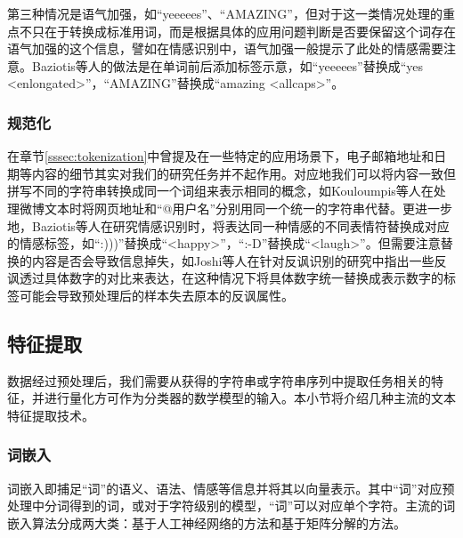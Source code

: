 第三种情况是语气加强，如“yeeeees”、“AMAZING”，但对于这一类情况处理的重点不只在于转换成标准用词，而是根据具体的应用问题判断是否要保留这个词存在语气加强的这个信息，譬如在情感识别中，语气加强一般提示了此处的情感需要注意。Baziotis等人\cite{baziotis2017semeval2}的做法是在单词前后添加标签示意，如“yeeeees”替换成“yes <enlongated>”，“AMAZING”替换成“amazing <allcaps>”。

\subsubsection{规范化}

在章节\ref{sssec:tokenization}中曾提及在一些特定的应用场景下，电子邮箱地址和日期等内容的细节其实对我们的研究任务并不起作用。对应地我们可以将内容一致但拼写不同的字符串转换成同一个词组来表示相同的概念，如Kouloumpis等人\cite{kouloumpis2011twitter}在处理微博文本时将网页地址和“@用户名”分别用同一个统一的字符串代替。更进一步地，Baziotis等人\cite{baziotis2017semeval2}在研究情感识别时，将表达同一种情感的不同表情符替换成对应的情感标签，如“:)))”替换成“<happy>”，“:-D”替换成“<laugh>”。但需要注意替换的内容是否会导致信息掉失，如Joshi等人\cite{joshi2015harnessing}在针对反讽识别的研究中指出一些反讽透过具体数字的对比来表达，在这种情况下将具体数字统一替换成表示数字的标签可能会导致预处理后的样本失去原本的反讽属性。

\subsection{特征提取}
\label{ssec:feature_extraction}

数据经过预处理后，我们需要从获得的字符串或字符串序列中提取任务相关的特征，并进行量化方可作为分类器的数学模型的输入。本小节将介绍几种主流的文本特征提取技术。

\subsubsection{词嵌入}
\label{sssec:embedding}

词嵌入即捕足“词”的语义、语法、情感等信息并将其以向量表示。其中“词”对应预处理中分词得到的词，或对于字符级别的模型，“词”可以对应单个字符\cite{baziotis2018ntua}。主流的词嵌入算法分成两大类：基于人工神经网络的方法和基于矩阵分解的方法。

